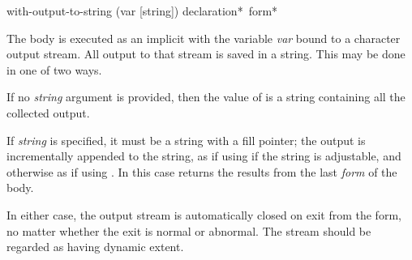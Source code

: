 \begin{obsolete}
\begin{defmac}
with-output-to-string (var [string]) {declaration}* {\,form}*

The body is executed as an implicit  with the variable \emph{var}
bound to a character output stream.  All output to that stream
is saved in a string.  This may be done in one of two ways.

If no \emph{string} argument is provided, then
the value of
 is a string containing all the collected output.

If \emph{string} is specified, it must be a string with a fill pointer;
the output is incrementally appended to the string,
as if using  if the string is adjustable,
and otherwise as if using .
In this case 
returns the results from the last \emph{form} of the body.

In either case,
the output stream is automatically closed on exit from
the  form,
no matter whether the exit is normal or abnormal.
The stream should be regarded as having dynamic extent.
\end{defmac}
\end{obsolete}

